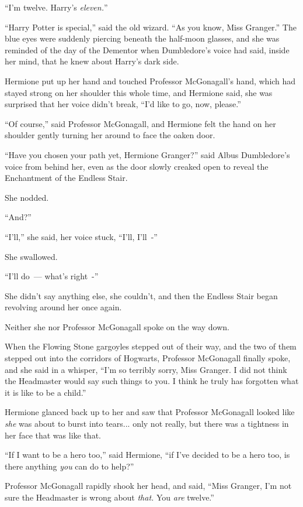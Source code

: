 ``I'm twelve. Harry's \emph{eleven.}''

``Harry Potter is special,'' said the old wizard. ``As you know, Miss Granger.'' The blue eyes were suddenly piercing beneath the half-moon glasses, and she was reminded of the day of the Dementor when Dumbledore's voice had said, inside her mind, that he knew about Harry's dark side.

Hermione put up her hand and touched Professor McGonagall's hand, which had stayed strong on her shoulder this whole time, and Hermione said, she was surprised that her voice didn't break, ``I'd like to go, now, please.''

``Of course,'' said Professor McGonagall, and Hermione felt the hand on her shoulder gently turning her around to face the oaken door.

``Have you chosen your path yet, Hermione Granger?'' said Albus Dumbledore's voice from behind her, even as the door slowly creaked open to reveal the Enchantment of the Endless Stair.

She nodded.

``And?''

``I'll,'' she said, her voice stuck, ``I'll, I'll~-''

She swallowed.

``I'll do~--- what's right~-''

She didn't say anything else, she couldn't, and then the Endless Stair began revolving around her once again.

Neither she nor Professor McGonagall spoke on the way down.

When the Flowing Stone gargoyles stepped out of their way, and the two of them stepped out into the corridors of Hogwarts, Professor McGonagall finally spoke, and she said in a whisper, ``I'm so terribly sorry, Miss Granger. I did not think the Headmaster would say such things to you. I think he truly has forgotten what it is like to be a child.''

Hermione glanced back up to her and saw that Professor McGonagall looked like \emph{she} was about to burst into tears... only not really, but there was a tightness in her face that was like that.

``If I want to be a hero too,'' said Hermione, ``if I've decided to be a hero too, is there anything \emph{you} can do to help?''

Professor McGonagall rapidly shook her head, and said, ``Miss Granger, I'm not sure the Headmaster is wrong about \emph{that.} You \emph{are} twelve.''


